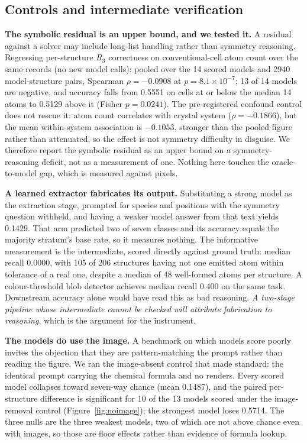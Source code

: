\subsection{Controls and intermediate verification}
\label{sec:controls}

\textbf{The symbolic residual is an upper bound, and we tested it.} A residual against a solver may include
long-list handling rather than symmetry reasoning. Regressing per-structure $R_3$ correctness on
conventional-cell atom count over the same records (no new model calls): pooled over the 14 scored models
and 2940 model-structure pairs, Spearman $\rho = -0.0908$ at $p = 8.1\times10^{-7}$; 13 of 14 models are
negative, and accuracy falls from 0.5551 on cells at or below the median 14 atoms to 0.5129 above it
(Fisher $p = 0.0241$). The pre-registered confound control does not rescue it: atom count correlates with
crystal system ($\rho = -0.1866$), but the mean within-system association is $-0.1053$, stronger than the
pooled figure rather than attenuated, so the effect is not symmetry difficulty in disguise. We therefore
report the symbolic residual as an upper bound on a symmetry-reasoning deficit, not as a measurement of
one. Nothing here touches the oracle-to-model gap, which is measured against pixels.

\textbf{A learned extractor fabricates its output.} Substituting a strong model as the extraction stage,
prompted for species and positions with the symmetry question withheld, and having a weaker model answer
from that text yields 0.1429. That arm predicted two of seven classes and its accuracy equals the majority
stratum's base rate, so it measures nothing. The informative measurement is the intermediate, scored
directly against ground truth: median recall 0.0000, with 105 of 206 structures having not one emitted atom
within tolerance of a real one, despite a median of 48 well-formed atoms per structure. A colour-threshold
blob detector achieves median recall 0.400 on the same task. Downstream accuracy alone would have read this
as bad reasoning. \emph{A two-stage pipeline whose intermediate cannot be checked will attribute
fabrication to reasoning}, which is the argument for the instrument.

\textbf{The models do use the image.} A benchmark on which models score poorly invites the objection that
they are pattern-matching the prompt rather than reading the figure. We ran the image-absent control that
\citet{cotdeg2604} made standard: the identical prompt carrying the chemical formula and no renders. Every
scored model collapses toward seven-way chance (mean 0.1487), and the paired per-structure difference is
significant for 10 of the 13 models scored under the image-removal control (Figure~\ref{fig:noimage}); the
strongest model loses 0.5714. The three nulls are the three weakest models, two of which are not above
chance even with images, so those are floor effects rather than evidence of formula lookup.

